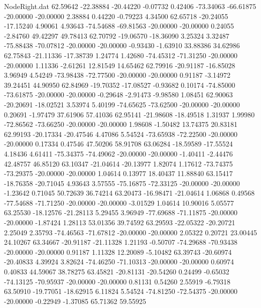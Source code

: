 \begin{filecontents}{NodeRight.dat}
  62.59642  -22.38884  -20.44220    -0.07732    0.42406  -73.34063  -66.61875  -20.00000  -20.00000    2.38884    0.44220   -0.79223    4.34500
  62.65718  -20.24055  -17.15240     4.90061    4.93643  -74.54688  -69.81563  -20.00000  -20.00000    0.24055   -2.84760   49.42297   49.78413
  62.70792  -19.06570  -18.36090     3.25324    3.32487  -75.88438  -70.07812  -20.00000  -20.00000   -0.93430   -1.63910   33.88386   34.62986
  62.75843  -21.11336  -17.38739     1.24774    1.42680  -74.45312  -71.31250  -20.00000  -20.00000    1.11336   -2.61261   12.81549   14.65462
  62.79916  -20.91187  -16.85028     3.96949    4.54249  -73.98438  -72.77500  -20.00000  -20.00000    0.91187   -3.14972   39.24451   44.90950
  62.84969  -19.70352  -17.08527    -0.93682    0.10174  -74.85000  -73.61875  -20.00000  -20.00000   -0.29648   -2.91473   -9.98580    1.08451
  62.90063  -20.20691  -18.02521     3.53974    5.40199  -74.65625  -73.62500  -20.00000  -20.00000    0.20691   -1.97479   37.61906   57.41036
  62.95141  -21.98608  -18.49518     1.31937    1.99980  -72.86562  -73.66250  -20.00000  -20.00000    1.98608   -1.50482   13.74375   20.83181
  62.99193  -20.17334  -20.47546     4.47086    5.54524  -73.65938  -72.22500  -20.00000  -20.00000    0.17334    0.47546   47.50206   58.91708
  63.06284  -18.59589  -17.55524     4.18436    4.61411  -75.34375  -74.49062  -20.00000  -20.00000   -1.40411   -2.44476   42.48757   46.85120
  63.10347  -21.04614  -20.13977     1.82074    1.17612  -73.74375  -73.29375  -20.00000  -20.00000    1.04614    0.13977   18.40437   11.88840
  63.15417  -18.76358  -20.71045     4.93643    3.57555  -75.16875  -72.33125  -20.00000  -20.00000   -1.23642    0.71045   50.72639   36.74214
  63.20473  -16.98471  -21.04614     1.06868    0.49568  -77.54688  -71.71250  -20.00000  -20.00000   -3.01529    1.04614   10.90016    5.05577
  63.25530  -18.12576  -21.28113     5.29455    3.96949  -77.69688  -71.11875  -20.00000  -20.00000   -1.87424    1.28113   53.01356   39.74592
  63.29593  -22.05322  -20.20721     2.25049    2.35793  -74.46563  -71.67812  -20.00000  -20.00000    2.05322    0.20721   23.00445   24.10267
  63.34667  -20.91187  -21.11328     1.21193   -0.50707  -74.29688  -70.93438  -20.00000  -20.00000    0.91187    1.11328   12.20089   -5.10482
  63.39743  -20.60974  -20.40833     4.39924    3.82624  -74.46250  -71.10313  -20.00000  -20.00000    0.60974    0.40833   44.59067   38.78275
  63.45821  -20.81131  -20.54260     0.24499   -0.65032  -74.13125  -70.95937  -20.00000  -20.00000    0.81131    0.54260    2.55919   -6.79318
  63.50910  -19.77051  -18.62915     6.11824    5.54524  -74.81250  -72.54375  -20.00000  -20.00000   -0.22949   -1.37085   65.71362   59.55925

\end{filecontents}
